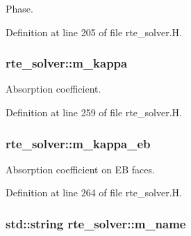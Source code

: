 Phase. 



Definition at line 205 of file rte\+\_\+solver.\+H.

\subsubsection[{\texorpdfstring{m\+\_\+kappa}{m_kappa}}]{ rte\+\_\+solver\+::m\+\_\+kappa\hspace{0.3cm}{\ttfamily [protected]}}\hypertarget{classrte__solver_ae5cfc01b0a14fe67e896cbeddb172771}{}\label{classrte__solver_ae5cfc01b0a14fe67e896cbeddb172771}


Absorption coefficient. 



Definition at line 259 of file rte\+\_\+solver.\+H.

\subsubsection[{\texorpdfstring{m\+\_\+kappa\+\_\+eb}{m_kappa_eb}}]{ rte\+\_\+solver\+::m\+\_\+kappa\+\_\+eb\hspace{0.3cm}{\ttfamily [protected]}}\hypertarget{classrte__solver_ab0c0eea8bb4b68fced66198a4535a199}{}\label{classrte__solver_ab0c0eea8bb4b68fced66198a4535a199}


Absorption coefficient on EB faces. 



Definition at line 264 of file rte\+\_\+solver.\+H.

\subsubsection[{\texorpdfstring{m\+\_\+name}{m_name}}]{\setlength{\rightskip}{0pt plus 5cm}std\+::string rte\+\_\+solver\+::m\+\_\+name\hspace{0.3cm}{\ttfamily [protected]}}\hypertarget{classrte__solver_ae382b783ea69f9ce1a90a5bbe5b62724}{}\label{classrte__solver_ae382b783ea69f9ce1a90a5bbe5b62724}


